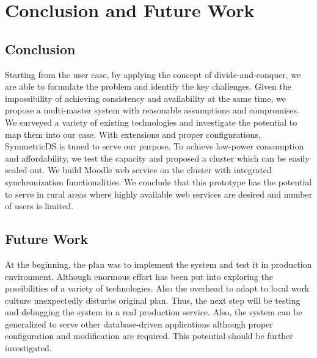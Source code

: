 \chapter{Conclusion and Future Work}
\section{Conclusion}
Starting from the user case, by applying the concept of divide-and-conquer, we are able to formulate the problem and identify the key challenges. Given the impossibility of achieving consistency and availability at the same time, we propose a multi-master system with reasonable assumptions and compromises. We surveyed a variety of existing technologies and investigate the potential to map them into our case. With extensions and proper configurations, SymmetricDS is tuned to serve our purpose. To achieve low-power consumption and affordability, we test the capacity and proposed a cluster which can be easily scaled out. We build Moodle web service on the cluster with integrated synchronization functionalities. We conclude that this prototype has the potential to serve in rural areas where highly available web services are desired and number of users is limited.
\section{Future Work}
At the beginning, the plan was to implement the system and test it in production environment. Although enormous effort has been put into exploring the possibilities of a variety of technologies. Also the overhead to adapt to local work culture unexpectedly disturbs original plan. Thus, the next step will be testing and debugging the system in a real production service. Also, the system can be generalized to serve other database-driven applications although proper configuration and modification are required. This potential should be further investigated.
